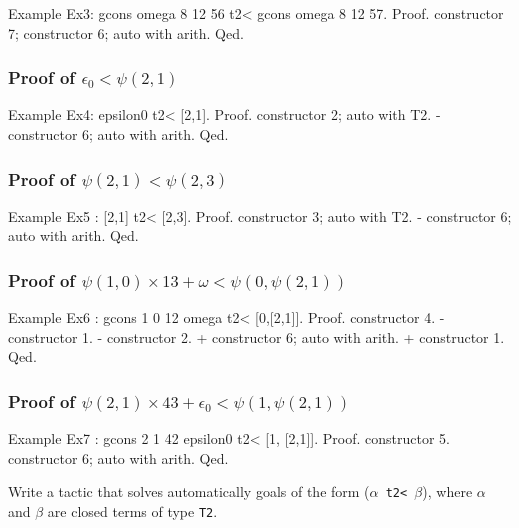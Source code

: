 {\begin{Coqsrc}
Example Ex3: gcons omega 8 12 56 t2<  gcons omega 8 12 57.
Proof.
  constructor 7; constructor 6; auto with arith.
Qed.
\end{Coqsrc}

\subsubsection*{Proof of $\epsilon_0<\psi(2,1)$}

\begin{Coqsrc}
Example Ex4: epsilon0 t2< [2,1].
Proof.
   constructor 2; auto with T2.
   - constructor 6; auto with arith.
Qed.
\end{Coqsrc}

\subsubsection*{Proof of $\psi(2,1)<\psi(2,3)$}

\begin{Coqsrc}
Example Ex5 : [2,1] t2< [2,3].
Proof.
  constructor 3; auto with T2.
  - constructor 6; auto with arith.
Qed.
\end{Coqsrc}

\subsubsection*{Proof of $\psi(1,0)\times 13+ \omega < \psi(0,\psi(2,1))$}
\label{sect:ex6-first-proof}

\begin{Coqsrc}
Example Ex6 : gcons 1 0 12 omega t2< [0,[2,1]].
Proof.
  constructor 4.
  - constructor 1.
  - constructor 2.
    + constructor 6; auto with arith.
    + constructor 1.
Qed.
\end{Coqsrc}

\subsubsection*{Proof of $\psi(2,1)\times 43 + \epsilon_0 < \psi(1,\psi(2,1))$}

\begin{Coqsrc}
Example Ex7 : gcons 2 1 42 epsilon0 t2< [1, [2,1]].
Proof.
 constructor 5.
 constructor 6; auto with arith.
Qed.
\end{Coqsrc}

\begin{project}
Write a tactic that solves automatically goals of the form (\texttt{$\alpha$ t2< $\beta$}), where $\alpha$ and $\beta$ are closed terms of type \texttt{T2}.
\end{project}

}
